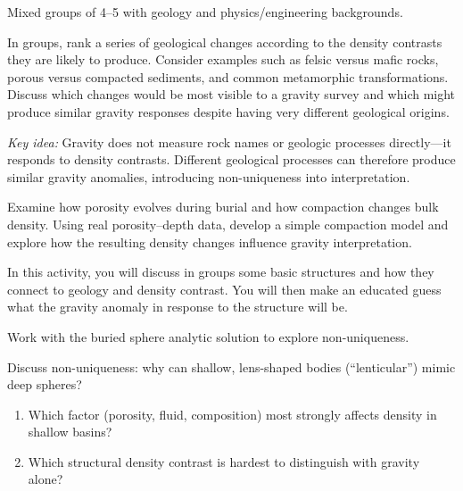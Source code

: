 Mixed groups of 4--5 with geology and physics/engineering backgrounds.  


In groups, rank a series of geological changes according to the density contrasts they are likely to produce. Consider examples such as felsic versus mafic rocks, porous versus compacted sediments, and common metamorphic transformations. Discuss which changes would be most visible to a gravity survey and which might produce similar gravity responses despite having very different geological origins.

\emph{Key idea:} Gravity does not measure rock names or geologic processes directly—it responds to density contrasts. Different geological processes can therefore produce similar gravity anomalies, introducing non-uniqueness into interpretation.



Examine how porosity evolves during burial and how compaction changes bulk density. Using real porosity--depth data, develop a simple compaction model and explore how the resulting density changes influence gravity interpretation.


In this activity, you will discuss in groups some basic structures and how they connect to geology and density contrast.  You will then make an educated guess what the gravity anomaly in response to the structure will be.


Work with the buried sphere analytic solution to explore non-uniqueness.

Discuss non-uniqueness: why can shallow, lens-shaped bodies (``lenticular'') mimic deep spheres?


\begin{enumerate}
  \item Which factor (porosity, fluid, composition) most strongly affects density in shallow basins?
  \item Which structural density contrast is hardest to distinguish with gravity alone?
\end{enumerate}


